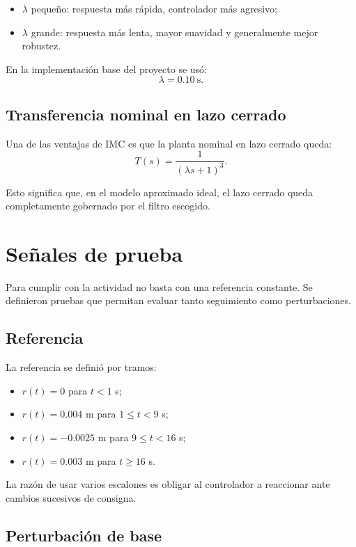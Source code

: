 \documentclass[11pt]{article}
\begin{document}
\begin{itemize}[leftmargin=1.2cm]
\item $\lambda$ peque\~no: respuesta m\'as r\'apida, controlador m\'as agresivo;
\item $\lambda$ grande: respuesta m\'as lenta, mayor suavidad y generalmente mejor robustez.
\end{itemize}

En la implementaci\'on base del proyecto se us\'o:
\[
\lambda = 0.10\ \text{s}.
\]

\subsection{Transferencia nominal en lazo cerrado}

Una de las ventajas de IMC es que la planta nominal en lazo cerrado queda:
\begin{equation}
T(s)=\frac{1}{(\lambda s+1)^3}.
\label{eq:tnom}
\end{equation}

Esto significa que, en el modelo aproximado ideal, el lazo cerrado queda completamente gobernado por el filtro escogido.

\section{Se\~nales de prueba}

Para cumplir con la actividad no basta con una referencia constante. Se definieron pruebas que permitan evaluar tanto seguimiento como perturbaciones.

\subsection{Referencia}

La referencia se defini\'o por tramos:

\begin{itemize}[leftmargin=1.2cm]
\item $r(t)=0$ para $t<1$ s;
\item $r(t)=0.004$ m para $1\le t<9$ s;
\item $r(t)=-0.0025$ m para $9\le t<16$ s;
\item $r(t)=0.003$ m para $t\ge16$ s.
\end{itemize}

La raz\'on de usar varios escalones es obligar al controlador a reaccionar ante cambios sucesivos de consigna.

\subsection{Perturbaci\'on de base}
\end{document}
